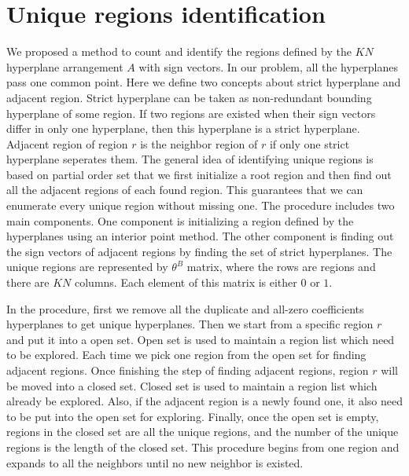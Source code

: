 \documentclass[11pt]{amsart}
\begin{document}
\section{Unique regions identification}
We proposed a method to count and identify the regions defined by the $KN$ hyperplane arrangement $A$ with sign vectors.
In our problem, all the hyperplanes pass one common point.
Here we define two concepts about strict hyperplane and adjacent region.
Strict hyperplane can be taken as non-redundant bounding hyperplane of some region.
If two regions are existed when their sign vectors differ in only one hyperplane, then this hyperplane is a strict hyperplane.
Adjacent region of region $r$ is the neighbor region of $r$ if only one strict hyperplane seperates them.
The general idea of identifying unique regions is based on partial order set that we first initialize a root region and then find out all the adjacent regions of each found region.
This guarantees that we can enumerate every unique region without missing one.
The procedure includes two main components.
One component is initializing a region defined by the hyperplanes using an interior point method.
The other component is finding out the sign vectors of adjacent regions by finding the set of strict hyperplanes.
The unique regions are represented by $\theta^B$ matrix, where the rows are regions and there are $KN$ columns. Each element of this matrix is either $0$ or $1$.

In the procedure, first we remove all the duplicate and all-zero coefficients hyperplanes to get unique hyperplanes.
Then we start from a specific region $r$ and put it into a open set.
Open set is used to maintain a region list which need to be explored.
Each time we pick one region from the open set for finding adjacent regions.
Once finishing the step of finding adjacent regions, region $r$ will be moved into a closed set.
Closed set is used to maintain a region list which already be explored.
Also, if the adjacent region is a newly found one, it also need to be put into the open set for exploring.
Finally, once the open set is empty, regions in the closed set are all the unique regions, and the number of the unique regions is the length of the closed set.
This procedure begins from one region and expands to all the neighbors until no new neighbor is existed.
\end{document}
